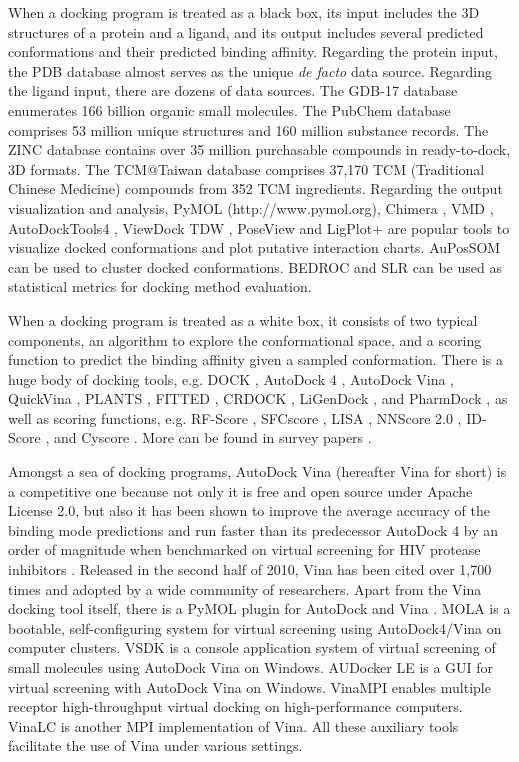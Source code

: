 When a docking program is treated as a black box, its input includes the 3D structures of a protein and a ligand, and its output includes several predicted conformations and their predicted binding affinity. Regarding the protein input, the PDB database \citep{539,537} almost serves as the unique \textit{de facto} data source. Regarding the ligand input, there are dozens of data sources. The GDB-17 database \citep{1276} enumerates 166 billion organic small molecules. The PubChem database \citep{526} comprises 53 million unique structures and 160 million substance records. The ZINC database \citep{532,1178} contains over 35 million purchasable compounds in ready-to-dock, 3D formats. The TCM@Taiwan database \citep{528} comprises 37,170 TCM (Traditional Chinese Medicine) compounds from 352 TCM ingredients. Regarding the output visualization and analysis, PyMOL (http://www.pymol.org), Chimera \citep{1219}, VMD \citep{1220}, AutoDockTools4 \citep{596}, ViewDock TDW \citep{559}, PoseView \citep{748} and LigPlot+ \citep{951} are popular tools to visualize docked conformations and plot putative interaction charts. AuPosSOM \citep{598} can be used to cluster docked conformations. BEDROC \citep{490} and SLR \citep{489} can be used as statistical metrics for docking method evaluation.

When a docking program is treated as a white box, it consists of two typical components, an algorithm to explore the conformational space, and a scoring function to predict the binding affinity given a sampled conformation. There is a huge body of docking tools, e.g. DOCK \citep{1222,1445}, AutoDock 4 \citep{596}, AutoDock Vina \citep{595}, QuickVina \citep{1193}, PLANTS \citep{610,607,779}, FITTED \citep{602,603}, CRDOCK \citep{1200}, LiGenDock \citep{1495}, and PharmDock \citep{1376}, as well as scoring functions, e.g. RF-Score \citep{564,1370}, SFCscore \citep{581,1347}, LISA \citep{775}, NNScore 2.0 \citep{977}, ID-Score \cite{1305}, and Cyscore \cite{1372}. More can be found in survey papers \citep{493,922}.

Amongst a sea of docking programs, AutoDock Vina \citep{595} (hereafter Vina for short) is a competitive one because not only it is free and open source under Apache License 2.0, but also it has been shown to improve the average accuracy of the binding mode predictions \citep{595} and run faster than its predecessor AutoDock 4 \citep{596} by an order of magnitude when benchmarked on virtual screening for HIV protease inhibitors \citep{556}. Released in the second half of 2010, Vina has been cited over 1,700 times and adopted by a wide community of researchers. Apart from the Vina docking tool itself, there is a PyMOL plugin for AutoDock and Vina \citep{609}. MOLA \citep{773} is a bootable, self-configuring system for virtual screening using AutoDock4/Vina on computer clusters. VSDK \citep{1268} is a console application system of virtual screening of small molecules using AutoDock Vina on Windows. AUDocker LE \citep{1250} is a GUI for virtual screening with AutoDock Vina on Windows. VinaMPI \citep{1329} enables multiple receptor high-throughput virtual docking on high-performance computers. VinaLC \citep{1562} is another MPI implementation of Vina. All these auxiliary tools facilitate the use of Vina under various settings.

